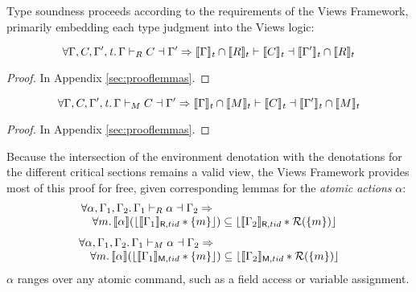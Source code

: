 Type soundness proceeds according to the requirements of the Views Framework, primarily embedding each type judgment into the Views logic:
\begin{lemma}\label{lemma:embedr}
\[  \forall\Gamma,C,\Gamma',\mathit{t}\ldotp\Gamma\vdash_R C\dashv \Gamma' \Rightarrow
\llbracket\Gamma\rrbracket_\mathit{t}\cap\llbracket{R}\rrbracket_t\vdash \llbracket C\rrbracket_\mathit{t}\dashv\llbracket\Gamma'\rrbracket_\mathit{t}\cap\llbracket{R}\rrbracket_t
\]
\end{lemma}
\begin{proof}
In Appendix \ref{sec:prooflemmas}.
  \end{proof}
\begin{lemma}\label{lemma:embedw}
  \[
\forall\Gamma,C,\Gamma',\mathit{t}\ldotp\Gamma\vdash_M C\dashv \Gamma' \Rightarrow
\llbracket\Gamma\rrbracket_\mathit{t}\cap\llbracket{M}\rrbracket_t\vdash \llbracket C\rrbracket_\mathit{t}\dashv\llbracket\Gamma'\rrbracket_\mathit{t}\cap\llbracket{M}\rrbracket_t
\]
\end{lemma}
\begin{proof}
In Appendix \ref{sec:prooflemmas}.
  \end{proof}
Because the intersection of the environment denotation with the denotations for the different critical sections remains a valid view, the Views Framework provides most of this proof for free, given corresponding lemmas for the \emph{atomic actions} $\alpha$:
\[\begin{array}{l}
\forall \alpha,\Gamma_1,\Gamma_2\ldotp \Gamma_1\vdash_R\alpha\dashv\Gamma_2 \Rightarrow
\\
\quad\forall m\ldotp   \llbracket \alpha \rrbracket  (\lfloor \llbracket \Gamma_{1} \rrbracket_{\textsf{R},tid}  * \{m\} \rfloor )\subseteq  \lfloor \llbracket \Gamma_{2} \rrbracket_{\textsf{R},tid} * \mathcal{R}(\{m\}) \rfloor
\end{array}\]
\[
\begin{array}{l}
\forall \alpha,\Gamma_1,\Gamma_2\ldotp \Gamma_1\vdash_M\alpha\dashv\Gamma_2 \Rightarrow
\\
\quad\forall m\ldotp   \llbracket \alpha \rrbracket  (\lfloor \llbracket \Gamma_{1} \rrbracket_{\textsf{M},tid}  * \{m\} \rfloor )\subseteq  \lfloor \llbracket \Gamma_{2} \rrbracket_{\textsf{M},tid} * \mathcal{R}(\{m\}) \rfloor
\end{array}
\]
$\alpha$ ranges over any atomic command, such as a field access or variable assignment.

